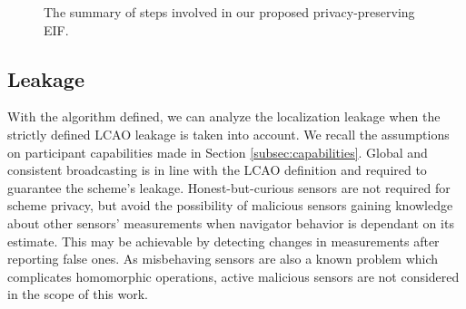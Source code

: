 \documentclass[10pt,letterpaper,oneside,twocolumn,journal]{IEEEtran}
\theoremstyle{definition}
\theoremstyle{definition}
\theoremstyle{remark}
\begin{document}
\begin{figure}[htbp]
\vspace{\baselineskip}
\caption{The summary of steps involved in our proposed privacy-preserving EIF.}
\label{fig:alg_steps}
\end{figure}

% 
% 

\subsection{Leakage} \label{subsec:leakage}
With the algorithm defined, we can analyze the localization leakage when the strictly defined LCAO leakage is taken into account. We recall the assumptions on participant capabilities made in Section \ref{subsec:capabilities}. Global and consistent broadcasting is in line with the LCAO definition and required to guarantee the scheme's leakage. Honest-but-curious sensors are not required for scheme privacy, but avoid the possibility of malicious sensors gaining knowledge about other sensors' measurements when navigator behavior is dependant on its estimate. This may be achievable by detecting changes in measurements after reporting false ones. As misbehaving sensors are also a known problem which complicates homomorphic operations, active malicious sensors are not considered in the scope of this work.
\end{document}
